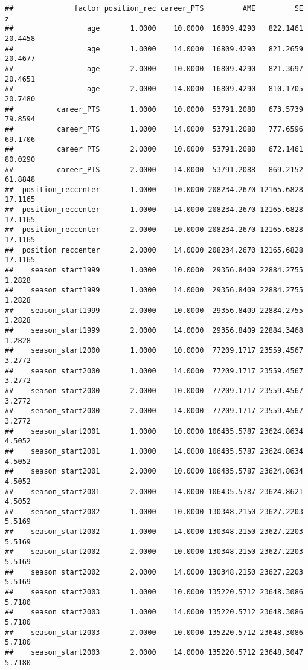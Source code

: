 \documentclass[
]{book}
\begin{document}
\begin{verbatim}
##              factor position_rec career_PTS         AME         SE       z
##                 age       1.0000    10.0000  16809.4290   822.1461 20.4458
##                 age       1.0000    14.0000  16809.4290   821.2659 20.4677
##                 age       2.0000    10.0000  16809.4290   821.3697 20.4651
##                 age       2.0000    14.0000  16809.4290   810.1705 20.7480
##          career_PTS       1.0000    10.0000  53791.2088   673.5739 79.8594
##          career_PTS       1.0000    14.0000  53791.2088   777.6596 69.1706
##          career_PTS       2.0000    10.0000  53791.2088   672.1461 80.0290
##          career_PTS       2.0000    14.0000  53791.2088   869.2152 61.8848
##  position_reccenter       1.0000    10.0000 208234.2670 12165.6828 17.1165
##  position_reccenter       1.0000    14.0000 208234.2670 12165.6828 17.1165
##  position_reccenter       2.0000    10.0000 208234.2670 12165.6828 17.1165
##  position_reccenter       2.0000    14.0000 208234.2670 12165.6828 17.1165
##    season_start1999       1.0000    10.0000  29356.8409 22884.2755  1.2828
##    season_start1999       1.0000    14.0000  29356.8409 22884.2755  1.2828
##    season_start1999       2.0000    10.0000  29356.8409 22884.2755  1.2828
##    season_start1999       2.0000    14.0000  29356.8409 22884.3468  1.2828
##    season_start2000       1.0000    10.0000  77209.1717 23559.4567  3.2772
##    season_start2000       1.0000    14.0000  77209.1717 23559.4567  3.2772
##    season_start2000       2.0000    10.0000  77209.1717 23559.4567  3.2772
##    season_start2000       2.0000    14.0000  77209.1717 23559.4567  3.2772
##    season_start2001       1.0000    10.0000 106435.5787 23624.8634  4.5052
##    season_start2001       1.0000    14.0000 106435.5787 23624.8634  4.5052
##    season_start2001       2.0000    10.0000 106435.5787 23624.8634  4.5052
##    season_start2001       2.0000    14.0000 106435.5787 23624.8621  4.5052
##    season_start2002       1.0000    10.0000 130348.2150 23627.2203  5.5169
##    season_start2002       1.0000    14.0000 130348.2150 23627.2203  5.5169
##    season_start2002       2.0000    10.0000 130348.2150 23627.2203  5.5169
##    season_start2002       2.0000    14.0000 130348.2150 23627.2203  5.5169
##    season_start2003       1.0000    10.0000 135220.5712 23648.3086  5.7180
##    season_start2003       1.0000    14.0000 135220.5712 23648.3086  5.7180
##    season_start2003       2.0000    10.0000 135220.5712 23648.3086  5.7180
##    season_start2003       2.0000    14.0000 135220.5712 23648.3047  5.7180

\end{verbatim}
\end{document}
